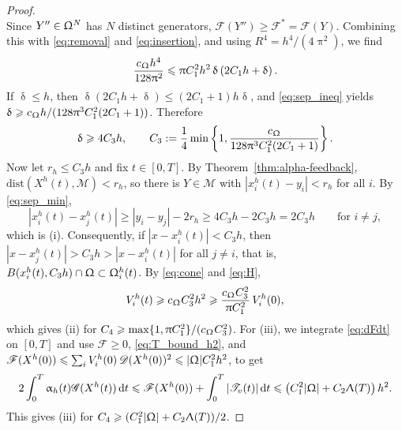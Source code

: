 \documentclass[letterpaper,11pt,twoside]{article}
\numberwithin{figure}{section}
\numberwithin{table}{section}
\theoremstyle{cpamplain}
\theoremstyle{cpamdefinition}
\newcommand{\diff}{\mathrm{d}}
\newcommand{\dist}{\mathrm{dist}}
\let\alpha\upalpha
\let\delta\updelta
\let\pi\uppi
\let\Lambda\Uplambda
\let\Omega\Upomega
\renewcommand{\le}{\leqslant}
\renewcommand{\ge}{\geqslant}
\numberwithin{equation}{section}
\begin{document}
\begin{proof}
\begin{equation}
\end{equation}
Since $Y''\in\Omega^N$ has $N$ distinct generators, $\mathscr F(Y'')\ge\mathscr F^\ast=\mathscr F(Y)$.
Combining this with \eqref{eq:removal} and \eqref{eq:insertion}, and using $R^4=h^4/(4\pi^2)$, we find
\begin{equation}\label{eq:sep_ineq}
\frac{c_\Omega h^4}{128\pi^2}\le\pi C_1^2h^2\,\delta\left(2C_1h+\delta\right).
\end{equation}
If $\delta\le h$, then $\delta(2C_1h+\delta)\le(2C_1+1)h\delta$, and \eqref{eq:sep_ineq} yields $\delta\ge c_\Omega h/(128\pi^3C_1^2(2C_1+1))$. Therefore
\begin{equation}\label{eq:sep_min}
\delta\ge4C_3h,
\qquad
C_3:=\frac14\min\left\{1,\frac{c_\Omega}{128\pi^3C_1^2(2C_1+1)}\right\}.
\end{equation}
Now let $r_h\le C_3h$ and fix $t\in[0,T]$.
By Theorem~\ref{thm:alpha-feedback}, $\dist(X^h(t),\mathcal M)<r_h$, so there is $Y\in\mathcal M$ with $|x_i^h(t)-y_i|<r_h$ for all $i$.
By \eqref{eq:sep_min},
\[
|x_i^h(t)-x_j^h(t)|\ge|y_i-y_j|-2r_h\ge4C_3h-2C_3h=2C_3h
\qquad\text{for }i\ne j,
\]
which is \textup{(i)}.
Consequently, if $|x-x_i^h(t)|<C_3h$, then $|x-x_j^h(t)|>C_3h>|x-x_i^h(t)|$ for all $j\ne i$, that is, $B(x_i^h(t),C_3h)\cap\Omega\subset\Omega_i^h(t)$.
By \eqref{eq:cone} and \eqref{eq:H},
\begin{equation}\label{eq:vol_bounds}
V_i^h(t)\ge c_\Omega C_3^2h^2
\ge\frac{c_\Omega C_3^2}{\pi C_1^2}\,V_i^h(0),
\end{equation}
which gives \textup{(ii)} for $C_4\ge\max\{1,\pi C_1^2\}/(c_\Omega C_3^2)$.
For \textup{(iii)}, we integrate \eqref{eq:dFdt} on $[0,T]$ and use $\mathscr F\ge0$, \eqref{eq:T_bound_h2}, and $\mathscr F(X^h(0))\le\sum_iV_i^h(0)\,\mathscr D(X^h(0))^2\le|\Omega|C_1^2h^2$, to get
\[
2\int_0^T\alpha_h(t)\mathscr G(X^h(t))\,\diff t
\le\mathscr F(X^h(0))+\int_0^T|\mathscr T_v(t)|\,\diff t
\le\left(C_1^2|\Omega|+C_2\Lambda(T)\right)h^2 .
\]
This gives \textup{(iii)} for $C_4\ge(C_1^2|\Omega|+C_2\Lambda(T))/2$.


\end{proof}
\end{document}
